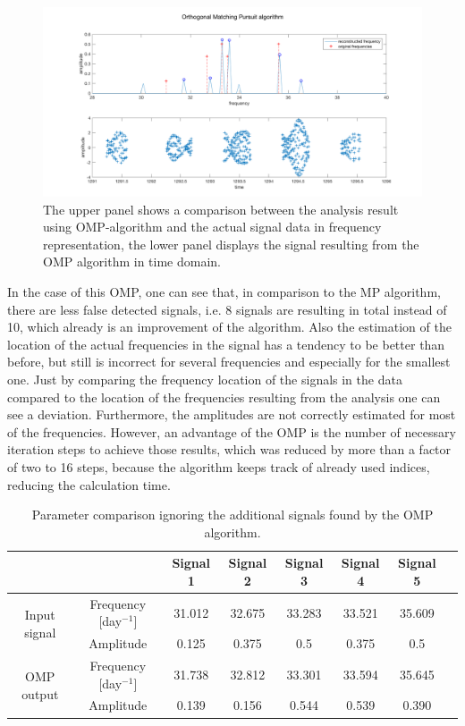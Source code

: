 \begin{figure}[H]
	\centering
		\includegraphics[width=\textwidth]{images/omp}
		\caption{The upper panel shows a comparison between the analysis result using OMP-algorithm and the actual signal data in frequency representation, the lower panel displays the signal resulting from the OMP algorithm in time domain.}
		\label{fig:omp}
\end{figure}

In the case of this OMP, one can see that, in comparison to the MP algorithm, there are less false detected signals, i.e. 8 signals are resulting in total instead of 10, which already is an improvement of the algorithm. Also the estimation of the location of the actual frequencies in the signal has a tendency to be better than before, but still is incorrect for several frequencies and especially for the smallest one. Just by comparing the frequency location of the signals in the data compared to the location of the frequencies resulting from the analysis one can see a deviation. Furthermore, the amplitudes are not correctly estimated for most of the frequencies. However, an advantage of the OMP is the number of necessary iteration steps to achieve those results, which was reduced by more than a factor of two to 16 steps, because the algorithm keeps track of already used indices, reducing the calculation time.

\begin{table}[H]
\centering
\begin{tabular}{ | c| c| c| c| c| c|c|c| }
\hline
	&   & Signal 1 & Signal 2 & Signal 3 & Signal 4 & Signal 5 \\ \hline
\multirow{2}{3cm}{Input signal} & Frequency [day$^{-1}$] & 31.012 & 32.675 & 33.283 & 33.521 & 35.609 \\ \cline{2-7}
 & Amplitude & 0.125 & 0.375 & 0.5 & 0.375 & 0.5 \\ \hline

\multirow{2}{3cm}{OMP output} & Frequency [day$^{-1}$] & 31.738  & 32.812 & 33.301 & 33.594  & 35.645  \\ \cline{2-7}
 & Amplitude & 0.139 & 0.156 & 0.544  & 0.539  & 0.390 \\ \hline

\end{tabular}
\caption{Parameter comparison ignoring the additional signals found by the OMP algorithm.}
\label{tab:omp}
\end{table}


